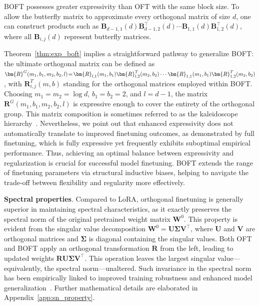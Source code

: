 \begin{theorem}\label{thm:exp_boft}
    BOFT possesses greater expressivity than OFT with the same block size. To allow the butterfly matrix to approximate every orthogonal matrix of size $d$, one can construct products such as $\bm{B}_{d-1,1}(d)\bm{B}^\top_{d-1,2}(d)\cdots\bm{B}_{1,1}(d)\bm{B}^\top_{1,2}(d)$, where all $\bm{B}_{i,j}(d)$ represent butterfly matrices.
\end{theorem}

Theorem~\ref{thm:exp_boft} implies a straightforward pathway to generalize BOFT: the ultimate orthogonal matrix can be defined as $\thickmuskip=2mu \medmuskip=2mu \bm{R}^G(m_1,b_1,m_2,b_2,l)=\bm{R}_{l,1}(m_1,b_1)\bm{R}_{l,2}^T(m_2,b_2)\cdots\bm{R}_{1,1}(m_1,b_1)\bm{R}_{1,2}^T(m_2,b_2)$, with $\bm{R}_{i,j}^T(m,b)$ standing for the orthogonal matrices employed within BOFT. Choosing $m_1=m_2=\log d$, $b_1=b_2=2$, and $l=d-1$, the matrix $\bm{R}^G(m_1,b_1,m_2,b_2,l)$ is expressive enough to cover the entirety of the orthogonal group. This matrix composition is sometimes referred to as the kaleidoscope hierarchy~\cite{dao2019kaleidoscope}. Nevertheless, we point out that enhanced expressivity does not automatically translate to improved finetuning outcomes, as demonstrated by full finetuning, which is fully expressive yet frequently exhibits suboptimal empirical performance. Thus, achieving an optimal balance between expressivity and regularization is crucial for successful model finetuning. BOFT extends the range of finetuning parameters via structural inductive biases, helping to navigate the trade-off between flexibility and regularity more effectively.

\textbf{Spectral properties}. Compared to LoRA, orthogonal finetuning is generally superior in maintaining spectral characteristics, as it exactly preserves the spectral norm of the original pretrained weight matrix $\bm{W}^0$. This property is evident from the singular value decomposition $\bm{W}^0 = \bm{U} \bm{\Sigma} \bm{V}^\top$, where $\bm{U}$ and $\bm{V}$ are orthogonal matrices and $\bm{\Sigma}$ is diagonal containing the singular values. Both OFT and BOFT apply an orthogonal transformation $\bm{R}$ from the left, leading to updated weights $\bm{R}\bm{U}\bm{\Sigma}\bm{V}^\top$. This operation leaves the largest singular value—equivalently, the spectral norm—unaltered. Such invariance in the spectral norm has been empirically linked to improved training robustness and enhanced model generalization~\cite{miyato2018spectral,yoshida2017spectral}. Further mathematical details are elaborated in Appendix~\ref{app:sn_property}.

